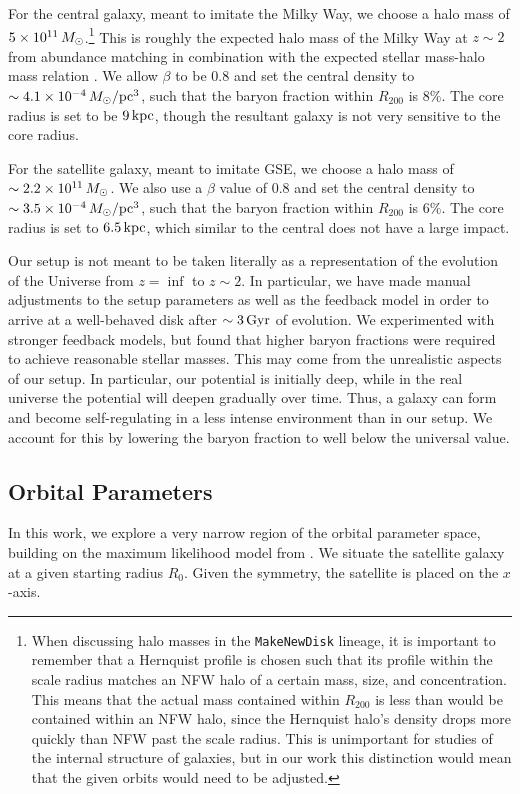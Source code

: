 For the central galaxy, meant to imitate the Milky Way, we choose a halo mass of $5\times10^{11}\,M_{\odot}$.\footnote{When discussing halo masses in the \texttt{MakeNewDisk} lineage, it is important to remember that a Hernquist profile is chosen such that its profile within the scale radius matches an NFW halo of a certain mass, size, and concentration. This means that the actual mass contained within $R_{200}$ is less than would be contained within an NFW halo, since the Hernquist halo's density drops more quickly than NFW past the scale radius. This is unimportant for studies of the internal structure of galaxies, but in our work this distinction would mean that the given orbits would need to be adjusted.} This is roughly the expected halo mass of the Milky Way at $z\sim2$ from abundance matching in combination with the expected stellar mass-halo mass relation . We allow $\beta$ to be $0.8$ and set the central density to $\sim4.1\times10^{-4}\,M_{\odot}/\textrm{pc}^3$, such that the baryon fraction within $R_{200}$ is $8\%$. The core radius is set to be $9\,\textrm{kpc}$, though the resultant galaxy is not very sensitive to the core radius.

For the satellite galaxy, meant to imitate GSE, we choose a halo mass of $\sim2.2\times10^{11}\,M_{\odot}$. We also use a $\beta$ value of $0.8$ and set the central density to $\sim3.5\times10^{-4}\,M_{\odot}/\textrm{pc}^3$, such that the baryon fraction within $R_{200}$ is $6\%$. The core radius is set to $6.5\,\textrm{kpc}$, which similar to the central does not have a large impact.

Our setup is not meant to be taken literally as a representation of the evolution of the Universe from $z=\inf$ to $z\sim2$. In particular, we have made manual adjustments to the setup parameters as well as the feedback model in order to arrive at a well-behaved disk after $\sim3\,\textrm{Gyr}$ of evolution. We experimented with stronger feedback models, but found that higher baryon fractions were required to achieve reasonable stellar masses. This may come from the unrealistic aspects of our setup. In particular, our potential is initially deep, while in the real universe the potential will deepen gradually over time. Thus, a galaxy can form and become self-regulating in a less intense environment than in our setup. We account for this by lowering the baryon fraction to well below the universal value.

\subsection{Orbital Parameters}\label{ssec:orbits}
In this work, we explore a very narrow region of the orbital parameter space, building on the maximum likelihood model from \citet{2021ApJ...923...92N}. We situate the satellite galaxy at a given starting radius $R_0$. Given the symmetry, the satellite is placed on the $x$-axis. 

